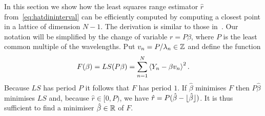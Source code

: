 \documentclass[10pt,twocolumn,twoside]{IEEEtran}
\begin{document}
In this section we show how the least squares range estimator $\hat{r}$ from~\eqref{eq:hatdininterval} can be efficiently computed by computing a closest point in a lattice of dimension $N-1$.  The derivation is similar to those in~\cite{McKilliamFrequencyEstimationByPhaseUnwrapping2009,McKilliam_mean_dir_est_sq_arc_length2010,McKilliam_pps_unwrapping_tsp_2014}.  Our notation will be simplified by the change of variable $r = P\beta$, where $P$ is the least common multiple of the wavelengths.  Put $v_n = P/\lambda_n \in {\mathbb Z}$ and define the function
\[
F(\beta) = LS(P\beta) = \sum_{n=1}^N\left\langle Y_n - \beta v_n \right\rangle^2.
\]
Because $LS$ has period $P$ it follows that $F$ has period $1$.  If $\hat{\beta}$ minimises $F$ then $P\hat{\beta}$ minimises $LS$ and, because $\hat{r} \in [0,P)$, we have $\hat{r} = P( \hat{\beta} - {\lfloor \hat{\beta} \rfloor} )$.  It is thus sufficient to find a minimiser $\hat{\beta} \in {\mathbb R}$ of $F$.
\end{document}
